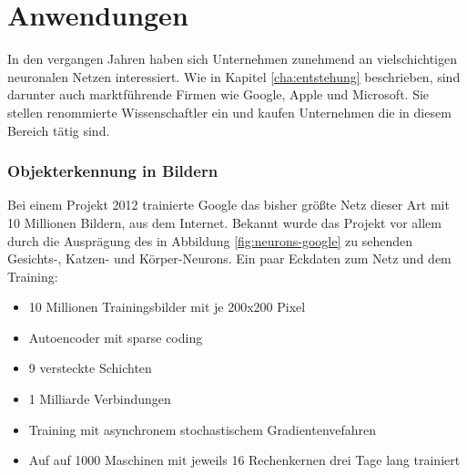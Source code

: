\chapter{Anwendungen}
\label{cha:anwendungen}

In den vergangen Jahren haben sich Unternehmen zunehmend an vielschichtigen neuronalen Netzen interessiert. Wie in Kapitel \ref{cha:entstehung} beschrieben, sind darunter auch marktführende Firmen wie Google, Apple und Microsoft. Sie stellen renommierte Wissenschaftler ein und kaufen Unternehmen die in diesem Bereich tätig sind.

\subsection{Objekterkennung in Bildern}

Bei einem Projekt \citep{googleimage} 2012 trainierte Google das bisher größte Netz dieser Art mit 10 Millionen Bildern, aus dem Internet. Bekannt wurde das Projekt vor allem durch die Ausprägung des in Abbildung \ref{fig:neurons-google} zu sehenden Gesichts-, Katzen- und Körper-Neurons. Ein paar Eckdaten zum Netz und dem Training:

\begin{itemize}
\item 10 Millionen Trainingsbilder mit je 200x200 Pixel
\item Autoencoder mit sparse coding
\item 9 versteckte Schichten
\item 1 Milliarde Verbindungen
\item Training mit asynchronem stochastischem Gradientenvefahren
\item Auf auf 1000 Maschinen mit jeweils 16 Rechenkernen drei Tage lang trainiert
\end{itemize}

